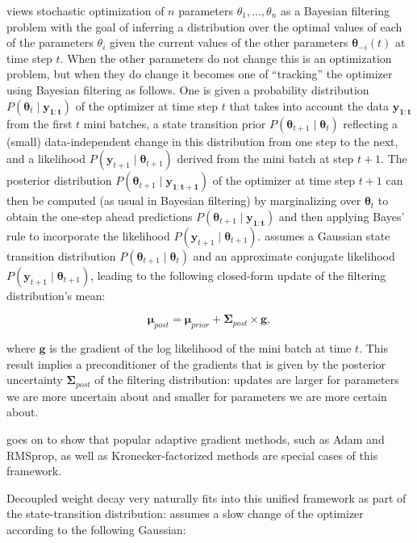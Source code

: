 \citet{aitchison18} views stochastic optimization of $n$ parameters $\theta_1, \dots, \theta_n$ as a Bayesian filtering problem with the goal of inferring a distribution over the optimal values of each of the parameters $\theta_i$ given the current values of the other parameters $\bm{\theta}_{-i}(t)$ at time step $t$. When the other parameters do not change this is an optimization problem, but when they do change it becomes one of ``tracking'' the optimizer using Bayesian filtering as follows. One is given a probability distribution $P(\bm{\theta}_{t} \mid \bm{y_{1:t}})$ of the optimizer at time step $t$ that takes into account the data $\bm{y_{1:t}}$ from the first $t$ mini batches, a state transition prior $P(\bm{\theta}_{t+1} \mid \bm{\theta}_t)$ reflecting a (small) data-independent change in this distribution from one step to the next, and a likelihood $P(\bm{y}_{t+1} \mid \bm{\theta}_{t+1})$ derived from the mini batch at step $t+1$. The posterior distribution $P(\bm{\theta}_{t+1} \mid \bm{y_{1:t+1}})$ of the optimizer at time step $t+1$ can then be computed (as usual in Bayesian filtering) by marginalizing over $\bm{\theta}_{t}$ to obtain the one-step ahead predictions $P(\bm{\theta}_{t+1} \mid \bm{y_{1:t}})$ and then applying Bayes' rule to incorporate the likelihood $P(\bm{y}_{t+1} \mid \bm{\theta}_{t+1})$. \citet{aitchison18} assumes a Gaussian state transition distribution $P(\bm{\theta}_{t+1} \mid \bm{\theta}_t)$ and an approximate conjugate likelihood $P(\bm{y}_{t+1} \mid \bm{\theta}_{t+1})$, leading to the following closed-form update of the filtering distribution's mean:

\begin{equation}
\bm{\mu}_{post} = \bm{\mu}_{prior} + \bm{\Sigma}_{post} \times \bm{g},
\end{equation}

where $\bm{g}$ is the gradient of the log likelihood of the mini batch at time $t$. This result implies a preconditioner of the gradients that is given by the posterior uncertainty $\bm{\Sigma}_{post}$ of the filtering distribution: updates are larger for parameters we are more uncertain about and smaller for parameters we are more certain about. 

\citet{aitchison18} goes on to show that popular adaptive gradient methods, such as Adam and RMSprop, as well as Kronecker-factorized methods are special cases of this framework.

Decoupled weight decay very naturally fits into this unified framework as part of the state-transition distribution: \citet{aitchison18} assumes a slow change of the optimizer according to the following Gaussian:

